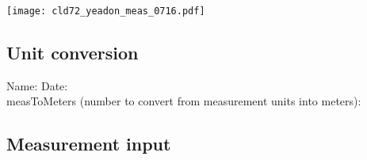 \documentclass[letterpaper]{scrartcl}
\begin{document}
\begin{center}
\texttt{[image: cld72\_yeadon\_meas\_0716.pdf]}
\end{center}

\newpage

\begin{Form}
\subsection*{Unit conversion}
Name: \TextField[name=Name,width=3in]{}  Date: \TextField[name=Date,width=2in]{}\\

measToMeters (number to convert from measurement units into meters): \TextField[name=measurementconversionfactor,width=.75in]{}
\subsection*{Measurement input}
\begin{tabular}{rlrlrl}


\end{tabular}
\end{Form}
\end{document}
